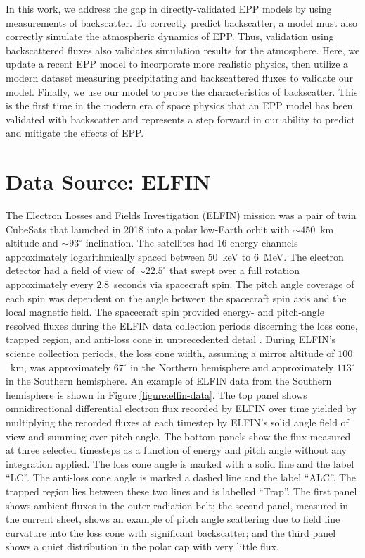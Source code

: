\documentclass[draft]{agujournal2019}
\newcommand{\mathdeg}{^\circ}
\begin{document}
In this work, we address the gap in directly-validated EPP models by using measurements of backscatter. To correctly predict backscatter, a model must also correctly simulate the atmospheric dynamics of EPP. Thus, validation using backscattered fluxes also validates simulation results for the atmosphere. Here, we update a recent EPP model to incorporate more realistic physics, then utilize a modern dataset measuring precipitating and backscattered fluxes to validate our model. Finally, we use our model to probe the characteristics of backscatter. This is the first time in the modern era of space physics that an EPP model has been validated with backscatter and represents a step forward in our ability to predict and mitigate the effects of EPP.

\section{Data Source: ELFIN}
The Electron Losses and Fields Investigation (ELFIN) mission was a pair of twin CubeSats that launched in 2018 into a polar low-Earth orbit with $\sim450$~km altitude and $\sim 93\mathdeg$ inclination. The satellites had 16 energy channels approximately logarithmically spaced between $50$~keV to $6$~MeV. The electron detector had a field of view of $\sim 22.5\mathdeg$ that swept over a full rotation approximately every $2.8$~seconds via spacecraft spin. The pitch angle coverage of each spin was dependent on the angle between the spacecraft spin axis and the local magnetic field. The spacecraft spin provided energy- and pitch-angle resolved fluxes during the ELFIN data collection periods discerning the loss cone, trapped region, and anti-loss cone in unprecedented detail \cite{angelopoulos2020, tsai2025}. During ELFIN's science collection periods, the loss cone width, assuming a mirror altitude of $100$~km, was approximately $67\mathdeg$ in the Northern hemisphere and approximately $113\mathdeg$ in the Southern hemisphere. An example of ELFIN data from the Southern hemisphere is shown in Figure \ref{figure:elfin-data}. The top panel shows omnidirectional differential electron flux recorded by ELFIN over time yielded by multiplying the recorded fluxes at each timestep by ELFIN's solid angle field of view and summing over pitch angle. The bottom panels show the flux measured at three selected timesteps as a function of energy and pitch angle without any integration applied. The loss cone angle is marked with a solid line and the label ``LC''. The anti-loss cone angle is marked a dashed line and the label ``ALC''. The trapped region lies between these two lines and is labelled ``Trap''. The first panel shows ambient fluxes in the outer radiation belt; the second panel, measured in the current sheet, shows an example of pitch angle scattering due to field line curvature into the loss cone with significant backscatter; and the third panel shows a quiet distribution in the polar cap with very little flux.
\end{document}

